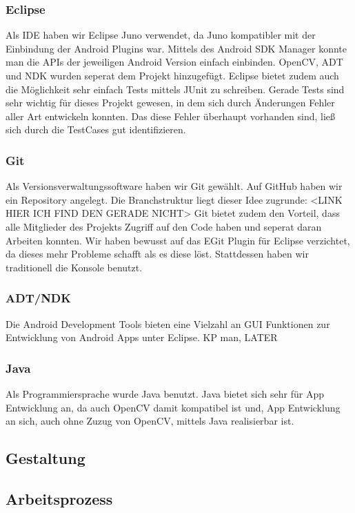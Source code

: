 \subsubsection{Eclipse}  %
Als IDE haben wir Eclipse Juno verwendet, da Juno kompatibler mit der Einbindung der Android Plugins war.
Mittels des Android SDK Manager konnte man die APIs der jeweiligen Android Version einfach einbinden.
OpenCV, ADT und NDK wurden seperat dem Projekt hinzugefügt.
Eclipse bietet zudem auch die Möglichkeit sehr einfach Tests mittels JUnit zu schreiben.
Gerade Tests sind sehr wichtig für dieses Projekt gewesen, in dem sich durch Änderungen Fehler aller Art
entwickeln konnten. Das diese Fehler überhaupt vorhanden sind, ließ sich durch die TestCases gut identifizieren.
\subsubsection{Git}  %
Als Versionsverwaltungssoftware haben wir Git gewählt. Auf GitHub haben wir ein Repository angelegt.
Die Branchstruktur liegt dieser Idee zugrunde: <LINK HIER ICH FIND DEN GERADE NICHT>
Git bietet zudem den Vorteil, dass alle Mitglieder des Projekts Zugriff auf den Code haben und
seperat daran Arbeiten konnten.
Wir haben bewusst auf das EGit Plugin für Eclipse verzichtet, da dieses mehr Probleme schafft als es diese löst.
Stattdessen haben wir traditionell die Konsole benutzt.
\subsubsection{ADT/NDK}  %
Die Android Development Tools bieten eine Vielzahl an GUI Funktionen zur Entwicklung von Android Apps unter Eclipse.
KP man, LATER
\subsubsection{Java}  %
Als Programmiersprache wurde Java benutzt. Java bietet sich sehr für App Entwicklung an, da auch OpenCV
damit kompatibel ist und, App Entwicklung an sich, auch ohne Zuzug von OpenCV, mittels Java realisierbar
ist.

\subsection{Gestaltung}  %
\subsection{Arbeitsprozess}  %

